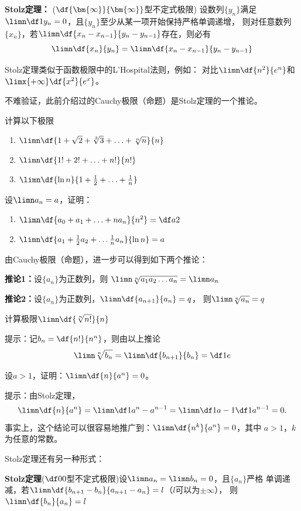 \begin{shaded}
\begin{thx}
	{\bf Stolz定理：}
	($\df{\bm{\infty}}{\bm{\infty}}$型不定式极限) 设数列$\{y_n\}$满足$\limn\df
	1{y_n}=0$，且$\{y_n\}$至少从某一项开始保持严格单调递增，
	则对任意数列$\{x_n\}$，若$\limn\df{x_n-x_{n-1}}{y_n-y_{n-1}}$存在，则必有
	$$\limn\df{x_n}{y_n}=\limn\df{x_n-x_{n-1}}{y_n-y_{n-1}}$$
\end{thx}

Stolz定理类似于函数极限中的L'Hospital法则，例如：
对比$\limn\df{n^2}{e^n}$和$\limx{+\infty}\df{x^2}{e^x}$。

不难验证，此前介绍过的Cauchy极限（命题）是Stolz定理的一个推论。

\bs
\egz 计算以下极限
\begin{enumerate}[(1)]
  \setlength{\itemindent}{1cm}
  \item $\limn\df{1+\sqrt 2+\sqrt[3]{3}+\ldots+\sqrt[n]{n}}{n}$ 
  \item $\limn\df{1!+2!+\ldots+n!}{n!}$
  \item $\limn\df{\ln n}{1+\frac12+\ldots+\frac1n}$
\end{enumerate}

\bs
\egz  设$\limn a_n=a$，证明：
\begin{enumerate}[(1)]
  \setlength{\itemindent}{1cm}
  \item $\limn\df{a_0+a_1+\ldots+na_n}{n^2}=\df a2$
  \item $\limn\df{a_1+\frac12a_2+\ldots\frac1na_n}{\ln n}=a$
\end{enumerate}

\bs
由Cauchy极限（命题），进一步可以得到如下两个推论：

\begin{thx}
{\bf 推论1：}设$\{a_n\}$为正数列，则
$\limn\sqrt[n]{a_1a_2\ldots a_n}=\limn a_n$

{\bf 推论2：}设$\{a_n\}$为正数列，$\limn\df{a_{n+1}}{a_n}=q$，
则$\limn\sqrt[n]{a_n}=q$
\end{thx}

\bs
\egz 计算极限$\limn\df{\sqrt[n]{n!}}{n}$

提示：记$b_n=\df{n!}{n^n}$，则由以上推论
$$\limn\sqrt[n]{b_n}=\limn\df{b_{n+1}}{b_n}=\df1e$$

\bs
\egz 设$a>1$，证明：$\limn\df{n}{a^n}=0$。

提示：由Stolz定理，
$$
	\limn\df{n}{a^n}=\limn\df1{a^n-a^{n-1}}
	=\limn\df1{a-1}\df1{a^{n-1}}=0.
$$
事实上，这个结论可以很容易地推广到：$\limn\df{n^k}{a^n}=0$，其中
$a>1$，$k$为任意的常数。

\bs
Stolz定理还有另一种形式：
\begin{thx}
	{\bf Stolz定理}($\df00$型不定式极限)设$\limn a_n=\limn b_n=0$，且$\{a_n\}$严格
	单调递减，若$\limn\df{b_{n+1}-b_n}{a_{n+1}-a_n}=l$（$l$可以为$\pm\infty$），
	则$\limn\df{b_n}{a_n}=l$
\end{thx}
\end{shaded}

